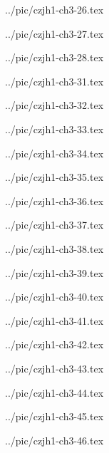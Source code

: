 ../pic/czjh1-ch3-26.tex



../pic/czjh1-ch3-27.tex



../pic/czjh1-ch3-28.tex



../pic/czjh1-ch3-31.tex



../pic/czjh1-ch3-32.tex



../pic/czjh1-ch3-33.tex



../pic/czjh1-ch3-34.tex



../pic/czjh1-ch3-35.tex



../pic/czjh1-ch3-36.tex



../pic/czjh1-ch3-37.tex



../pic/czjh1-ch3-38.tex



../pic/czjh1-ch3-39.tex



../pic/czjh1-ch3-40.tex



../pic/czjh1-ch3-41.tex



../pic/czjh1-ch3-42.tex



../pic/czjh1-ch3-43.tex



../pic/czjh1-ch3-44.tex



../pic/czjh1-ch3-45.tex



../pic/czjh1-ch3-46.tex



